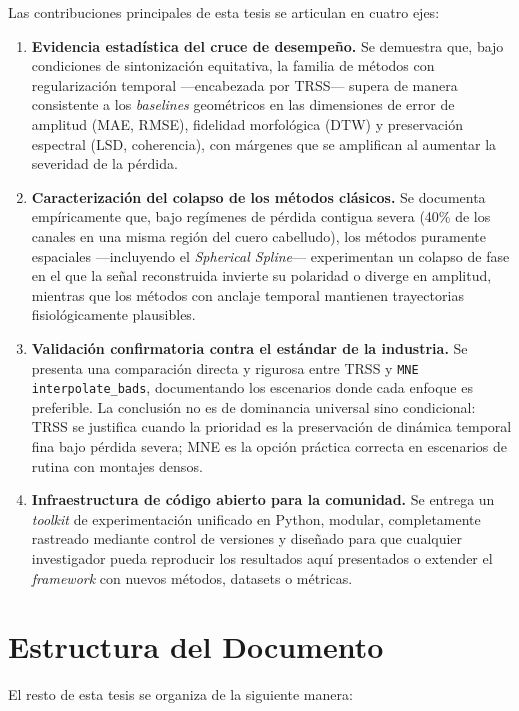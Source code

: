 Las contribuciones principales de esta tesis se articulan en cuatro ejes:

\begin{enumerate}
    \item \textbf{Evidencia estadística del cruce de desempeño.} Se demuestra que, bajo condiciones de sintonización equitativa, la familia de métodos con regularización temporal —encabezada por TRSS— supera de manera consistente a los \textit{baselines} geométricos en las dimensiones de error de amplitud (MAE, RMSE), fidelidad morfológica (DTW) y preservación espectral (LSD, coherencia), con márgenes que se amplifican al aumentar la severidad de la pérdida.

    \item \textbf{Caracterización del colapso de los métodos clásicos.} Se documenta empíricamente que, bajo regímenes de pérdida contigua severa (40\% de los canales en una misma región del cuero cabelludo), los métodos puramente espaciales —incluyendo el \textit{Spherical Spline}— experimentan un colapso de fase en el que la señal reconstruida invierte su polaridad o diverge en amplitud, mientras que los métodos con anclaje temporal mantienen trayectorias fisiológicamente plausibles.

    \item \textbf{Validación confirmatoria contra el estándar de la industria.} Se presenta una comparación directa y rigurosa entre TRSS y \texttt{MNE interpolate\_bads}, documentando los escenarios donde cada enfoque es preferible. La conclusión no es de dominancia universal sino condicional: TRSS se justifica cuando la prioridad es la preservación de dinámica temporal fina bajo pérdida severa; MNE es la opción práctica correcta en escenarios de rutina con montajes densos.

    \item \textbf{Infraestructura de código abierto para la comunidad.} Se entrega un \textit{toolkit} de experimentación unificado en Python, modular, completamente rastreado mediante control de versiones y diseñado para que cualquier investigador pueda reproducir los resultados aquí presentados o extender el \textit{framework} con nuevos métodos, datasets o métricas.
\end{enumerate}

\section{Estructura del Documento}

El resto de esta tesis se organiza de la siguiente manera:

